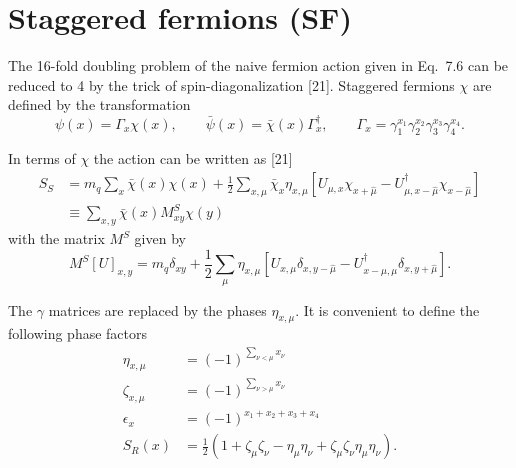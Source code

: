 \providecommand{\slashed}[1]{{\mathchoice
  {\ooalign{$\displaystyle#1$\cr\hidewidth$\displaystyle/$\hidewidth}}
  {\ooalign{$\textstyle#1$\cr\hidewidth$\textstyle/$\hidewidth}}
  {\ooalign{$\scriptstyle#1$\cr\hidewidth$\scriptstyle/$\hidewidth}}
  {\ooalign{$\scriptscriptstyle#1$\cr\hidewidth$\scriptscriptstyle/$\hidewidth}}}}

\chapter{Staggered fermions (SF)}

The 16-fold doubling problem of the naive fermion action given in Eq.~7.6
can be reduced to 4 by the trick of spin-diagonalization [21]. Staggered
fermions $\chi$ are defined by the transformation
\begin{equation}
\psi(x) = \Gamma_x \chi(x), \qquad \bar{\psi}(x) = \bar{\chi}(x)\Gamma_x^\dagger,
\qquad \Gamma_x = \gamma_1^{x_1}\gamma_2^{x_2}\gamma_3^{x_3}\gamma_4^{x_4} .
\label{eq:sf-spin-diag}
\end{equation}

In terms of $\chi$ the action can be written as [21]
\begin{equation}
\begin{aligned}
S_S &= m_q\sum_x \bar{\chi}(x)\chi(x)
+ \frac{1}{2}\sum_{x,\mu}\bar{\chi}_x\eta_{x,\mu}
\left[U_{\mu,x}\chi_{x+\hat{\mu}} - U^\dagger_{\mu,x-\hat{\mu}}\chi_{x-\hat{\mu}}\right] \\
&\equiv \sum_{x,y} \bar{\chi}(x) M^S_{xy}\chi(y)
\end{aligned}
\label{eq:sf-action}
\end{equation}
with the matrix $M^S$ given by
\begin{equation}
M^S[U]_{x,y} = m_q\delta_{xy}
+ \frac{1}{2}\sum_\mu\eta_{x,\mu}
\left[U_{x,\mu}\delta_{x,y-\hat{\mu}} - U^\dagger_{x-\hat{\mu},\mu}\delta_{x,y+\hat{\mu}}\right] .
\label{eq:sf-matrix}
\end{equation}

The $\gamma$ matrices are replaced by the phases $\eta_{x,\mu}$. It is convenient to define
the following phase factors
\begin{equation}
\begin{aligned}
\eta_{x,\mu} &= (-1)^{\sum_{\nu<\mu}x_\nu} \\
\zeta_{x,\mu} &= (-1)^{\sum_{\nu>\mu}x_\nu} \\
\epsilon_x &= (-1)^{x_1+x_2+x_3+x_4} \\
S_R(x) &= \frac{1}{2}\left(1 + \zeta_\mu\zeta_\nu - \eta_\mu\eta_\nu
+ \zeta_\mu\zeta_\nu\eta_\mu\eta_\nu\right) .
\end{aligned}
\label{eq:sf-phases}
\end{equation}

